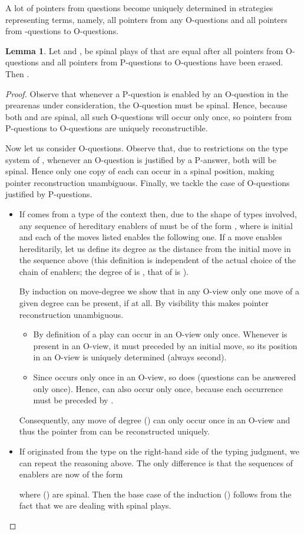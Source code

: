 \documentclass{CSML}
\theoremstyle{definition}\newtheorem{definition}[thm]{Definition}
\theoremstyle{definition}\newtheorem{example}[thm]{Example}
\theoremstyle{definition}\newtheorem{proposition}[thm]{Proposition}
\theoremstyle{definition}\newtheorem{lemma}[thm]{Lemma}
\theoremstyle{definition}\newtheorem{theorem}[thm]{Theorem}
\theoremstyle{definition}\newtheorem{corollary}[thm]{Corollary}
\theoremstyle{definition}\newtheorem{remark}[thm]{Remark}
\newcommand\nt[1]{#1}
\begin{document}
\noindent A lot of pointers from questions become uniquely determined in strategies
representing  terms, namely, all pointers from any O-questions and all
pointers from -questions to O-questions.
\begin{lemma}\label{lem:pointers}
Let  and ,  be spinal plays of 
that are equal after all pointers from O-questions and all pointers from P-questions
to O-questions have been erased. Then .
\end{lemma}
\begin{proof}
Observe that whenever a P-question 
is enabled by an O-question in the \nt{prearenas} under consideration, the O-question must be spinal. Hence,
because both  and  are spinal, all such O-questions will
occur only once, so pointers from P-questions to O-questions are 
uniquely reconstructible.

Now let us consider O-questions. Observe that, due to restrictions on the type
system of , whenever an O-question is justified by a P-answer, both will be
spinal. Hence only one copy of each can occur in a spinal position, making pointer
reconstruction unambiguous. Finally, we tackle the case of O-questions justified
by P-questions.

\begin{itemize}
\item If  comes from a type of the context then, due to the shape of types involved,
any sequence of hereditary enablers of  must be of the form 
, where 
is initial and each of the moves listed enables the following one.
If a move  enables  hereditarily, let us define its degree
as the distance from the initial move in the sequence above
(this definition is independent of the actual choice of the chain
of enablers; the degree of  is ,  that of  is ).

By induction on move-degree we show that in any O-view
only one move of a given degree can be present, if at all.
By visibility this makes pointer reconstruction unambiguous. 
\begin{itemize}
\item By definition of a play  can occur in an O-view only once.
Whenever  is present in an O-view, it must preceded by an initial move,
so its  position in an O-view is uniquely determined (always second).
\item Since  occurs only once in an O-view, so does  (questions can be
answered only once). Hence,  can also occur only once, because each
occurrence must be preceded by .
\end{itemize}
Consequently, any move of degree  () 
can only occur once in an O-view and thus the pointer from 
can be reconstructed uniquely.
\item If  originated from the type on the right-hand side of the typing
judgment, we can repeat the reasoning above. The only difference is
that the sequences of enablers are now of the form

where  () are spinal. Then the base case
of the induction () follows from the fact that we are dealing with
spinal plays.\qedhere
\end{itemize}
\end{proof}
\end{document}
